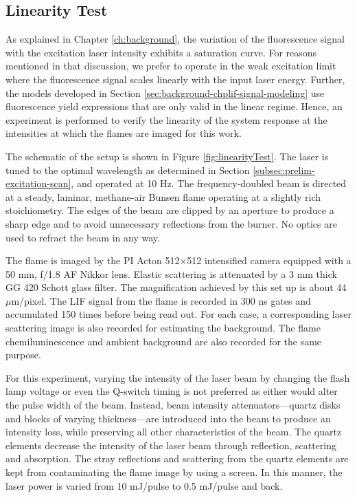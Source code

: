 \subsection{Linearity Test}
\label{subsec:prelim-linearity-test}




As explained in Chapter \ref{ch:background}, the variation of the fluorescence signal with the excitation laser intensity exhibits a saturation curve.
For reasons mentioned in that discussion, we prefer to operate in the weak excitation limit where the fluorescence signal scales linearly with the input laser energy.
Further, the models developed in Section \ref{sec:background-chplif-signal-modeling} use fluorescence yield expressions that are only valid in the linear regime.
Hence, an experiment is performed to verify the linearity of the system response at the intensities at which the flames are imaged for this work.

The schematic of the setup is shown in Figure \ref{fig:linearityTest}.
The laser is tuned to the optimal wavelength as determined in Section \ref{subsec:prelim-excitation-scan}, and operated at 10 Hz.
The frequency-doubled beam is directed at a steady, laminar, methane-air Bunsen flame operating at a slightly rich stoichiometry.
The edges of the beam are clipped by an aperture to produce a sharp edge and to avoid unnecessary reflections from the burner.
No optics are used to refract the beam in any way.

The flame is imaged by the PI Acton 512\(\times\)512 intensified camera equipped with a 50 mm, f/1.8 AF Nikkor lens.
Elastic scattering is attenuated by a 3 mm thick GG 420 Schott glass filter.
The magnification achieved by this set up is about 44 \(\mu\)m/pixel.
The LIF signal from the flame is recorded in 300 ns gates and accumulated 150 times before being read out.
For each case, a corresponding laser scattering image is also recorded for estimating the background.
The flame chemiluminescence and ambient background are also recorded for the same purpose.

For this experiment, varying the intensity of the laser beam by changing the flash lamp voltage or even the Q-switch timing is not preferred as either would alter the pulse width of the beam.
Instead, beam intensity attenuators---quartz disks and blocks of varying thickness---are introduced into the beam to produce an intensity loss, while preserving all other characteristics of the beam.
The quartz elements decrease the intensity of the laser beam through reflection, scattering and absorption.
The stray reflections and scattering from the quartz elements are kept from contaminating the flame image by using a screen.
In this manner, the laser power is varied from 10 mJ/pulse to 0.5 mJ/pulse and back.

